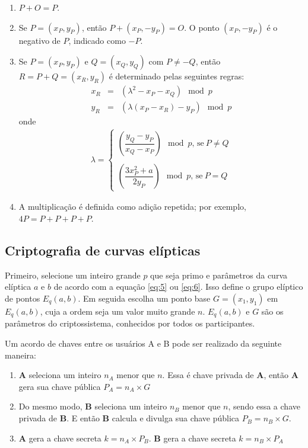 \begin{enumerate}
  \item $P + O = P$.
  \item Se $P = (x_P, y_P)$, então $P + (x_P, -y_P) = O$. O ponto $(x_P, -y_P)$ é o negativo de \(P\), indicado como \(-P\).
  \item Se $P = (x_P, y_P)$ e $Q = (x_Q, y_Q)$ com $P \neq -Q$, então $R = P + Q = (x_R, y_R)$ é determinado pelas seguintes regras:
    \begin{eqnarray*}
    x_R &=& (\lambda^2 - x_P - x_Q) \mod p \\
    y_R &=& (\lambda(x_P - x_R) - y_P) \mod p
    \end{eqnarray*}
  onde
    \begin{eqnarray*}
    \lambda =
    \begin{cases}
    \left(\dfrac{y_Q - y_P}{x_Q - x_P}\right) \mod p \textrm{, se} \ P \neq Q \\ \\
    \left(\dfrac{3x_P^2 + a}{2y_P}\right) \mod p \textrm{, se} \ P = Q
    \end{cases}
    \end{eqnarray*}
  \item A multiplicação é definida como adição repetida; por exemplo, $4P = P + P + P + P$.
\end{enumerate}

%
%
\subsection{Criptografia de curvas elípticas} \label{sec:ecc}
Primeiro, selecione um inteiro grande \(p\) que seja primo e parâmetros da curva elíptica \(a\) e \(b\) de acordo com a equação \ref{eq:5} ou \ref{eq:6}. Isso define o grupo elíptico de pontos $E_q(a, b)$. Em seguida escolha um ponto base $G = (x_1, y_1)$ em $E_q(a, b)$, cuja a ordem seja um valor muito grande \(n\). $E_q(a, b)$ e \(G\) são os parâmetros do criptossistema, conhecidos por todos os participantes.

Um acordo de chaves entre os usuários A e B pode ser realizado da seguinte maneira:
\begin{enumerate}
\item \textbf{A} seleciona um inteiro \(n_A\) menor que \(n\). Essa é chave privada de \textbf{A}, então \textbf{A} gera sua chave pública $P_A = n_A \times G$
\item Do mesmo modo, \textbf{B} seleciona um inteiro \(n_B\) menor que \(n\), sendo essa a chave privada de \textbf{B}. E então \textbf{B} calcula e divulga sua chave pública $P_B = n_B \times G$.
\item \textbf{A} gera a chave secreta $k = n_A \times P_B$. \textbf{B} gera a chave secreta $k = n_B \times P_A$
\end{enumerate}

